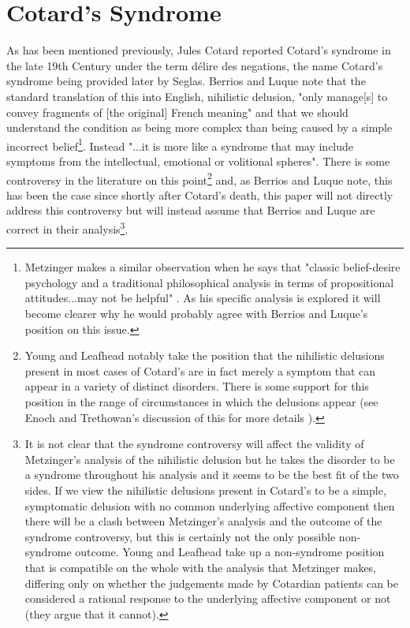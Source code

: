 \chapter{Cotard's Syndrome}
\label{chap:cotards}

As has been mentioned previously, Jules Cotard reported Cotard’s syndrome in the late 19th Century under the term délire des negations, the name Cotard’s syndrome being provided later by Seglas. Berrios and Luque\cite{berrios1995} note that the standard translation of this into English, nihilistic delusion, "only manage[s] to convey fragments of [the original] French meaning" and that we should understand the condition as being more complex than being caused by a simple incorrect belief\footnote{Metzinger makes a similar observation when he says that "classic belief-desire psychology and a traditional philosophical analysis in terms of propositional attitudes...may not be helpful" \cite[p. 458]{metzinger2003}. As his specific analysis is explored it will become clearer why he would probably agree with Berrios and Luque’s position on this issue.}. Instead "...it is more like a syndrome that may include symptoms from the intellectual, emotional or volitional spheres". There is some controversy in the literature on this point\footnote{Young and Leafhead \cite{young1995} notably take the position that the nihilistic delusions present in most cases of Cotard’s are in fact merely a symptom that can appear in a variety of distinct disorders. There is some support for this position in the range of circumstances in which the delusions appear (see Enoch and Trethowan’s discussion of this for more details \cite{enoch1991}).} and, as Berrios and Luque note, this has been the case since shortly after Cotard’s death, this paper will not directly address this controversy but will instead assume that Berrios and Luque are correct in their analysis\footnote{It is not clear that the syndrome controversy will affect the validity of Metzinger's analysis of the nihilistic delusion but he takes the disorder to be a syndrome throughout his analysis and it seems to be the best fit of the two sides. If we view the nihilistic delusions present in Cotard’s to be a simple, symptomatic delusion with no common underlying affective component then there will be a clash between Metzinger’s analysis and the outcome of the syndrome controversy, but this is certainly not the only possible non- syndrome outcome. Young and Leafhead take up a non-syndrome position that is compatible on the whole with the analysis that Metzinger makes, differing only on whether the judgements made by Cotardian patients can be considered a rational response to the underlying affective component or not (they argue that it cannot).}.

